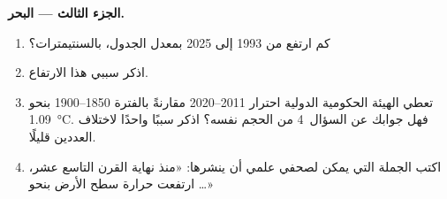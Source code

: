 \begin{problem}
\noindent\textbf{الجزء الثالث --- البحر.}\par\nopagebreak
\begin{enumerate}[resume, beginpenalty=10000]
  \item كم ارتفع  من 1993 إلى 2025 بمعدل الجدول، بالسنتيمترات؟
  \item اذكر سببي هذا الارتفاع.
  \item تعطي الهيئة الحكومية الدولية احترار 2011--2020 مقارنةً بالفترة
        1850--1900 بنحو \qty{1.09}{\degreeCelsius}. فهل جوابك عن
        السؤال~4 من الحجم نفسه؟ اذكر سببًا واحدًا لاختلاف العددين
        قليلًا.
  \item اكتب الجملة التي يمكن لصحفي علمي أن ينشرها: «منذ نهاية القرن
        التاسع عشر، ارتفعت حرارة سطح الأرض بنحو
        \ldots»
\end{enumerate}
\end{problem}
